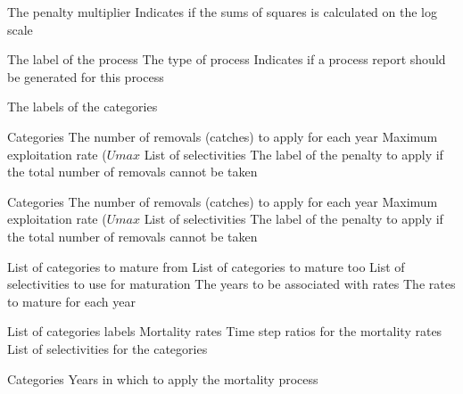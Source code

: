  {The penalty multiplier}
 {Indicates if the sums of squares is calculated on the log scale}
\par\par
{} {The label of the process}
 {The type of process}
 {Indicates if a process report should be generated for this process}
\par\textbf{}\par
{} {The labels of the categories}
\par\textbf{}\par
{} {Categories}
 {The number of removals (catches) to apply for each year}
 {Maximum exploitation rate ($Umax$}
 {List of selectivities}
 {The label of the penalty to apply if the total number of removals cannot be taken}
\par\textbf{}\par
{} {Categories}
 {The number of removals (catches) to apply for each year}
 {Maximum exploitation rate ($Umax$}
 {List of selectivities}
 {The label of the penalty to apply if the total number of removals cannot be taken}
\par\textbf{}\par
{} {List of categories to mature from}
 {List of categories to mature too}
 {List of selectivities to use for maturation}
 {The years to be associated with rates}
 {The rates to mature for each year}
\par\textbf{}\par
{} {List of categories labels}
 {Mortality rates}
 {Time step ratios for the mortality rates}
 {List of selectivities for the categories}
\par\textbf{}\par
{} {Categories}
 {Years in which to apply the mortality process}
